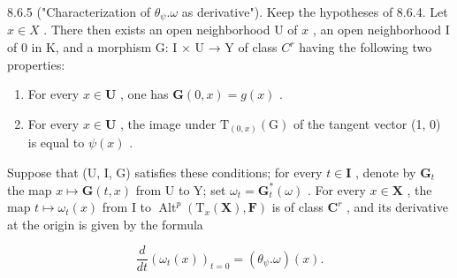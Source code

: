 8.6.5 ("Characterization of \(\theta_{\psi}.\omega\) as derivative"). Keep the hypotheses of 8.6.4. Let \(x\in X\) . There then exists an open neighborhood U of \(x\) , an open neighborhood I of 0 in K, and a morphism G: I × U → Y of class \(C^{r}\) having the following two properties:

\begin{enumerate}
\def\labelenumi{\alph{enumi})}
\item
  For every \(x \in \mathbf{U}\) , one has \(\mathbf{G}(0, x) = g(x)\) .
\item
  For every \(x \in \mathbf{U}\) , the image under \(\mathrm{T}_{(0,x)}(\mathrm{G})\) of the tangent vector (1, 0) is equal to \(\psi(x)\) .
\end{enumerate}

Suppose that (U, I, G) satisfies these conditions; for every \(t \in \mathbf{I}\) , denote by \(\mathbf{G}_t\) the map \(x \mapsto \mathbf{G}(t, x)\) from U to Y; set \(\omega_t = \mathbf{G}_t^*(\omega)\) . For every \(x \in \mathbf{X}\) , the map \(t \mapsto \omega_t(x)\) from I to \(\operatorname{Alt}^p(\mathrm{T}_x(\mathbf{X}), \mathbf{F})\) is of class \(\mathbf{C}^r\) , and its derivative at the origin is given by the formula

\[
\frac {d}{d t} (\omega_ {t} (x)) _ {t = 0} = (\theta_ {\psi}. \omega) (x).\tag{9}
\]

